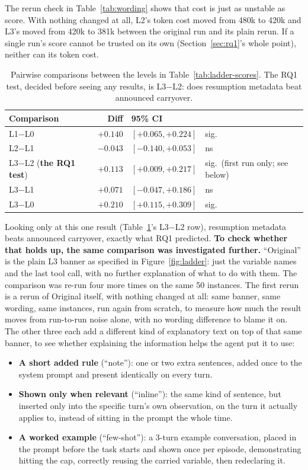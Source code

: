 \documentclass[11pt,a4paper]{article}
\newcommand{\cell}[1]{\textbf{#1}}
\begin{document}
The rerun check in Table~\ref{tab:wording} shows that cost is just as unstable as score. With
nothing changed at all, L2's token cost moved from 480k to 420k and L3's moved from 420k to 381k
between the original run and its plain rerun. If a single run's score cannot be trusted on its
own (Section~\ref{sec:rq1}'s whole point), neither can its token cost.

\begin{table}[H]
\centering
\small
\begin{tabular}{@{}lrll@{}}
\toprule
\cell{Comparison} & \cell{Diff} & \cell{95\% CI} & \\
\midrule
L1$-$L0 & $+0.140$ & $[+0.065,+0.224]$ & sig. \\
L2$-$L1 & $-0.043$ & $[-0.140,+0.053]$ & ns \\
L3$-$L2 (\textbf{the RQ1 test}) & $+0.113$ & $[+0.009,+0.217]$ & sig.\ (first run only; see below) \\
L3$-$L1 & $+0.071$ & $[-0.047,+0.186]$ & ns \\
L3$-$L0 & $+0.210$ & $[+0.115,+0.309]$ & sig. \\
\bottomrule
\end{tabular}
\caption{Pairwise comparisons between the levels in Table~\ref{tab:ladder-scores}. The RQ1
test, decided before seeing any results, is L3$-$L2: does resumption metadata beat announced
carryover.}
\label{tab:ladder-pairs}
\end{table}

Looking only at this one result (Table~\ref{tab:ladder-pairs}'s L3$-$L2 row), resumption
metadata beats announced carryover, exactly what RQ1 predicted. \textbf{To check whether that
holds up, the same comparison was investigated further.} ``Original'' is the plain L3 banner as
specified in Figure~\ref{fig:ladder}: just the variable names and the last tool call, with no
further explanation of what to do with them. The comparison was re-run four more times on the
same 50 instances. The first rerun is a rerun of Original itself, with nothing changed at all:
same banner, same wording, same instances, run again from scratch, to measure how much the
result moves from run-to-run noise alone, with no wording difference to blame it on. The other
three each add a different kind of explanatory text on top of that same banner, to see whether
explaining the information helps the agent put it to use:
\begin{itemize}
\item \textbf{A short added rule} (``note''): one or two extra sentences, added once to the
  system prompt and present identically on every turn.
\item \textbf{Shown only when relevant} (``inline''): the same kind of sentence, but inserted
  only into the specific turn's own observation, on the turn it actually applies to, instead of
  sitting in the prompt the whole time.
\item \textbf{A worked example} (``few-shot''): a 3-turn example conversation, placed in the
  prompt before the task starts and shown once per episode, demonstrating hitting the cap,
  correctly reusing the carried variable, then redeclaring it.
\end{itemize}
\end{document}
